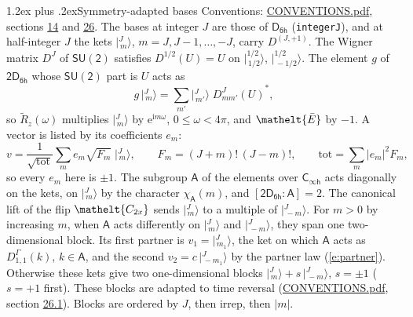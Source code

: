 \documentclass[10pt,a4paper]{article}
\makeatletter
\renewcommand\section{\@startsection{section}{1}{\z@}{-3ex plus -1ex minus -.2ex}%
  {1.2ex plus .2ex}{\normalfont\large\sffamily\bfseries\color{parttitle}}}
\numberwithin{equation}{section}
\newcommand{\eltfont}[1]{{\let\sigma\eltsigma\mathelt{#1}}}
\newcommand{\grp}[1]{\mathsf{#1}}
\newcommand{\elt}[1]{\eltfont{#1}}
\newcommand{\grpindex}[2]{[#1 : #2]}
\newcommand{\iunit}{\mathrm{i}}
\newcommand{\expe}{\mathrm{e}}
\newcommand{\irrJp}[2]{D^{(#1,#2)}}
\newcommand{\repD}[1]{D^{#1}}
\newcommand{\wignerD}[1]{D^{#1}}
\newcommand{\chiA}{\chi_{\grp{A}}}
\newcommand{\conj}[1]{{#1}^{*}}
\newcommand{\jm}[2]{\bigl\lvert{}^{#1}_{\,#2}\bigr\rangle}
\newcommand{\barred}[1]{\bar{#1}}
\newcommand{\lift}[1]{\tilde{#1}}
\makeatother
\begin{document}
\section{Symmetry-adapted bases}\label{s:bases}
Conventions: \href{../../CONVENTIONS.pdf}{CONVENTIONS.pdf}, sections \href{../../../rotation/CONVENTIONS.pdf\#conv.14}{14} and \href{../../CONVENTIONS.pdf\#conv.26}{26}.
\leavevmode\label{n:index.m}\label{n:vector.ket}The bases at integer $J$ are those of \href{../../../rotation/data/pdf/D6h.pdf}{$\grp{D_{6h}}$} (\texttt{integerJ}), and at half-integer $J$ the kets $\jm{J}{m}$, $m = J, J-1, \dots, -J$, carry $\irrJp{J}{+1}$. \label{n:matrix.wigner}The Wigner matrix $\wignerD{J}$ of $\grp{SU(2)}$ satisfies $\wignerD{1/2}(U) = U$ on $\jm{1/2}{1/2}$, $\jm{1/2}{-1/2}$. The element $g$ of $\grp{2D_{6h}}$ whose $\grp{SU(2)}$ part is $U$ acts as
\begin{equation}\label{e:action}g\,\jm{J}{m} = \sum_{m'} \jm{J}{m'}\; \conj{\wignerD{J}_{m m'}(U)},\end{equation}
so $\lift{R}_{z}(\omega)$ multiplies $\jm{J}{m}$ by $\expe^{\iunit m\omega}$, $0 \le \omega < 4\pi$, and $\elt{\barred{E}}$ by $-1$. \label{n:index.ketcoefficient}\label{n:vector.basis.symmetry}\label{n:index.ketweight}\label{n:index.total}A vector is listed by its coefficients $e_m$:
\begin{equation}\label{e:ket}v = \frac{1}{\sqrt{\mathrm{tot}}}\sum_m e_m\sqrt{F_m}\;\jm{J}{m},\qquad F_m = (J+m)!\,(J-m)!,\qquad \mathrm{tot} = \sum_m |e_m|^2F_m,\end{equation}
so every $e_m$ here is $\pm 1$.
\leavevmode\label{n:group.A}\label{n:function.character.abelian}The subgroup $\grp{A}$ of the elements over $\grp{C_{\infty h}}$ acts diagonally on the kets, on $\jm{J}{m}$ by the character $\chiA(m)$, and $\grpindex{\grp{2D_{6h}}}{\grp{A}} = 2$. The canonical lift of the flip $\elt{C_{2x}}$ sends $\jm{J}{m}$ to a multiple of $\jm{J}{-m}$. For $m > 0$ by increasing $m$, when $\grp{A}$ acts differently on $\jm{J}{m}$ and $\jm{J}{-m}$, they span one two-dimensional block. \label{n:index.partner.sign}Its first partner is $v_1 = \jm{J}{m_1}$, the ket on which $\grp{A}$ acts as $\repD{\Gamma}_{1,1}(k)$, $k \in \grp{A}$, and the second $v_2 = c\,\jm{J}{-m_1}$ by the partner law (\ref{e:partner}). \label{n:index.pair.sign}Otherwise these kets give two one-dimensional blocks $\jm{J}{m} + s\,\jm{J}{-m}$, $s = \pm 1$ ($s = +1$ first). These blocks are adapted to time reversal (\href{../../CONVENTIONS.pdf}{CONVENTIONS.pdf}, section \href{../../CONVENTIONS.pdf\#conv.26.1}{26.1}). Blocks are ordered by $J$, then irrep, then $|m|$.
\end{document}
